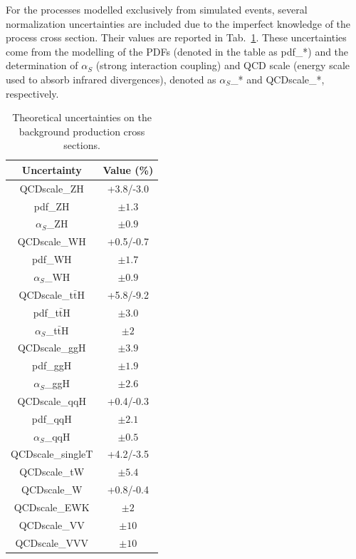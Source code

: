 \documentclass[../main.tex]{subfiles}
\begin{document}
For the processes modelled exclusively from simulated events, several normalization uncertainties are included due to the imperfect knowledge of the process cross section. Their values are reported in Tab.~\ref{hh:tab:xs_unc}. These uncertainties come from the modelling of the PDFs (denoted in the table as pdf\_*) and the determination of $\alpha_S$ (strong interaction coupling) and QCD scale (energy scale used to absorb infrared divergences), denoted as $\alpha_S$\_* and QCDscale\_*, respectively. 

\begin{table}[h!]
\begin{center}
\begin{tabular}{c | c }
Uncertainty & Value (\%) \\\hline
QCDscale\_ZH & +3.8/-3.0 \\
pdf\_ZH & $\pm1.3$ \\
$\alpha_S$\_ZH & $\pm0.9$ \\
QCDscale\_WH & +0.5/-0.7 \\
pdf\_WH & $\pm1.7$ \\
$\alpha_S$\_WH & $\pm0.9$ \\
QCDscale\_t$\bar{\text{t}}$H & +5.8/-9.2 \\
pdf\_t$\bar{\text{t}}$H & $\pm3.0$ \\
$\alpha_S$\_t$\bar{\text{t}}$H & $\pm2$ \\
QCDscale\_ggH & $\pm3.9$ \\
pdf\_ggH & $\pm1.9$ \\
$\alpha_S$\_ggH & $\pm2.6$ \\
QCDscale\_qqH & +0.4/-0.3 \\
pdf\_qqH & $\pm2.1$ \\
$\alpha_S$\_qqH & $\pm0.5$ \\
QCDscale\_singleT & +4.2/-3.5 \\
QCDscale\_tW & $\pm5.4$ \\
QCDscale\_W & +0.8/-0.4 \\
QCDscale\_EWK & $\pm2$ \\
QCDscale\_VV & $\pm10$ \\
QCDscale\_VVV & $\pm10$ \\
\end{tabular}
\end{center}
\caption[Theoretical uncertainties on the background production cross sections]{Theoretical uncertainties on the background production cross sections.}
\label{hh:tab:xs_unc}
\end{table}
\end{document}
